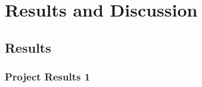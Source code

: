 \chapter{Results and Discussion}\label{chap:results_discussion}

\section{Results}\label{sec:Results}

\subsection{Project Results 1}\label{sec:project results}


